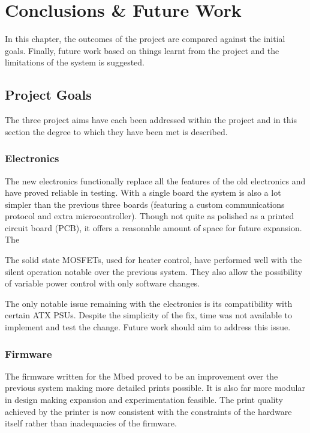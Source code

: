 \chapter{Conclusions \& Future Work}
	
	\label{sec:conclusions}
	
	In this chapter, the outcomes of the project are compared against the initial
	goals. Finally, future work based on things learnt from the project and the
	limitations of the system is suggested.
	
	\section{Project Goals}
		
		The three project aims have each been addressed within the project and in
		this section the degree to which they have been met is described.
		
		\subsection{Electronics}
			
			The new electronics functionally replace all the features of the old
			electronics and have proved reliable in testing.  With a single board the
			system is also a lot simpler than the previous three boards (featuring a
			custom communications protocol and extra microcontroller).  Though not
			quite as polished as a printed circuit board (PCB), it offers a reasonable
			amount of space for future expansion. The
			
			The solid state MOSFETs, used for heater control, have performed well with
			the silent operation notable over the previous system. They also allow the
			possibility of variable power control with only software changes.
			
			The only notable issue remaining with the electronics is its compatibility
			with certain ATX PSUs. Despite the simplicity of the fix, time was not
			available to implement and test the change. Future work should aim to
			address this issue.
		
		\subsection{Firmware}
			
			The firmware written for the Mbed proved to be an improvement over the
			previous system making more detailed prints possible. It is also far more
			modular in design making expansion and experimentation feasible. The print
			quality achieved by the printer is now consistent with the constraints of
			the hardware itself rather than inadequacies of the firmware.
			
